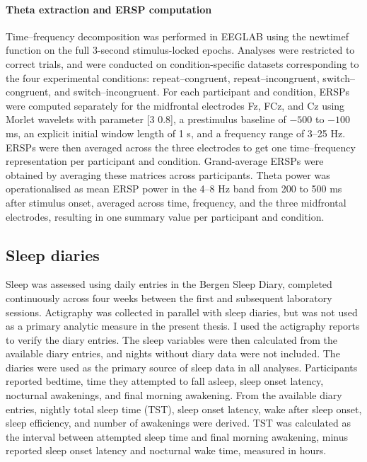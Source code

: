 \documentclass[12pt,a4paper]{report}
\begin{document}
\paragraph{Theta extraction and ERSP computation}
Time–frequency decomposition was performed in EEGLAB using the newtimef function on the full 3-second stimulus-locked epochs. Analyses were restricted to correct trials, and were conducted on condition-specific datasets corresponding to the four experimental conditions: repeat–congruent, repeat–incongruent, switch–congruent, and switch–incongruent. For each participant and condition, ERSPs were computed separately for the midfrontal electrodes Fz, FCz, and Cz using Morlet wavelets with parameter [3 0.8], a prestimulus baseline of $-500$ to $-100$ ms, an explicit initial window length of 1 s, and a frequency range of 3–25 Hz. ERSPs were then averaged across the three electrodes to get one time–frequency representation per participant and condition. Grand-average ERSPs were obtained by averaging these matrices across participants. Theta power was operationalised as mean ERSP power in the 4–8 Hz band from 200 to 500 ms after stimulus onset, averaged across time, frequency, and the three midfrontal electrodes, resulting in one summary value per participant and condition.


\subsection{Sleep diaries}
Sleep was assessed using daily entries in the Bergen Sleep Diary, completed continuously across four weeks between the first and subsequent laboratory sessions. Actigraphy was collected in parallel with sleep diaries, but was not used as a primary analytic measure in the present thesis. I used the actigraphy reports to verify the diary entries. The sleep variables were then calculated from the available diary entries, and nights without diary data were not included. The diaries were used as the primary source of sleep data in all analyses. Participants reported bedtime, time they attempted to fall asleep, sleep onset latency, nocturnal awakenings, and final morning awakening. From the available diary entries, nightly total sleep time (TST), sleep onset latency, wake after sleep onset, sleep efficiency, and number of awakenings were derived. TST was calculated as the interval between attempted sleep time and final morning awakening, minus reported sleep onset latency and nocturnal wake time, measured in hours. 
\end{document}
